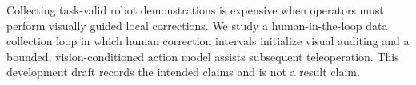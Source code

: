 Collecting task-valid robot demonstrations is expensive when operators must
perform visually guided local corrections. We study a human-in-the-loop data
collection loop in which human correction intervals initialize visual auditing
and a bounded, vision-conditioned action model assists subsequent teleoperation.
This development draft records the intended claims and is not a result claim.
